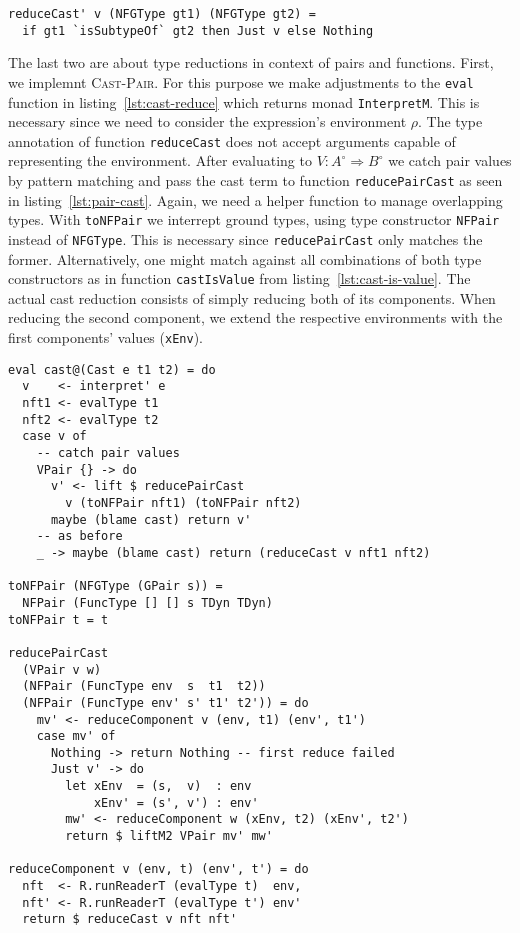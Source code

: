 \begin{lstlisting}[caption=Rule \textsc{Cast-Sub} (\texttt{Interpreter.hs})]
reduceCast' v (NFGType gt1) (NFGType gt2) =
  if gt1 `isSubtypeOf` gt2 then Just v else Nothing
\end{lstlisting}

The last two are about type reductions in context of pairs and functions. First, we implemnt \textsc{Cast-Pair}. For this purpose we make adjustments to the \texttt{eval} function in listing~\ref{lst:cast-reduce} which returns monad \texttt{InterpretM}. This is necessary since we need to consider the expression's environment $\rho$. The type annotation of function \texttt{reduceCast} does not accept arguments capable of representing the environment. After evaluating to $V : A^\circ \Rightarrow B^\circ$ we catch pair values by pattern matching and pass the cast term to function \texttt{reducePairCast} as seen in listing~\ref{lst:pair-cast}. Again, we need a helper function to manage overlapping types. With \texttt{toNFPair} we interrept ground types, using type constructor \texttt{NFPair} instead of \texttt{NFGType}. This is necessary since \texttt{reducePairCast} only matches the former. Alternatively, one might match against all combinations of both type constructors as in function \texttt{castIsValue} from listing~\ref{lst:cast-is-value}. The actual cast reduction consists of simply reducing both of its components. When reducing the second component, we extend the respective environments with the first components' values (\texttt{xEnv}).

\begin{lstlisting}[float,
  caption=Rule \textsc{Cast-Pair} (\texttt{Interpreter.hs}),
  label=lst:pair-cast]
eval cast@(Cast e t1 t2) = do
  v    <- interpret' e
  nft1 <- evalType t1
  nft2 <- evalType t2
  case v of
    -- catch pair values
    VPair {} -> do
      v' <- lift $ reducePairCast
        v (toNFPair nft1) (toNFPair nft2)
      maybe (blame cast) return v'
    -- as before
    _ -> maybe (blame cast) return (reduceCast v nft1 nft2)

toNFPair (NFGType (GPair s)) =
  NFPair (FuncType [] [] s TDyn TDyn)
toNFPair t = t

reducePairCast
  (VPair v w)
  (NFPair (FuncType env  s  t1  t2))
  (NFPair (FuncType env' s' t1' t2')) = do
    mv' <- reduceComponent v (env, t1) (env', t1')
    case mv' of
      Nothing -> return Nothing -- first reduce failed
      Just v' -> do
        let xEnv  = (s,  v)  : env
            xEnv' = (s', v') : env'
        mw' <- reduceComponent w (xEnv, t2) (xEnv', t2')
        return $ liftM2 VPair mv' mw'

reduceComponent v (env, t) (env', t') = do
  nft  <- R.runReaderT (evalType t)  env,
  nft' <- R.runReaderT (evalType t') env'
  return $ reduceCast v nft nft'
\end{lstlisting}

